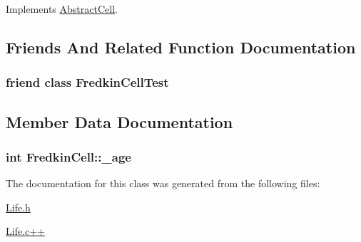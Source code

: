 Implements \hyperlink{classAbstractCell_a67008aedffea84aac7088ec84e8441cc}{Abstract\-Cell}.



\subsection{Friends And Related Function Documentation}
\hypertarget{classFredkinCell_aef267ce10e0a76047d409a41033eea05}{
\subsubsection[{Fredkin\-Cell\-Test}]{\setlength{\rightskip}{0pt plus 5cm}friend class Fredkin\-Cell\-Test\hspace{0.3cm}{\ttfamily [friend]}}}\label{classFredkinCell_aef267ce10e0a76047d409a41033eea05}


\subsection{Member Data Documentation}
\hypertarget{classFredkinCell_a2486375e903e4fec0a43d1b183fc1098}{
\subsubsection[{\-\_\-age}]{\setlength{\rightskip}{0pt plus 5cm}int Fredkin\-Cell\-::\-\_\-age\hspace{0.3cm}{\ttfamily [private]}}}\label{classFredkinCell_a2486375e903e4fec0a43d1b183fc1098}


The documentation for this class was generated from the following files\-:\begin{DoxyCompactItemize}
\item 
\hyperlink{Life_8h}{Life.\-h}\item 
\hyperlink{Life_8c_09_09}{Life.\-c++}\end{DoxyCompactItemize}
